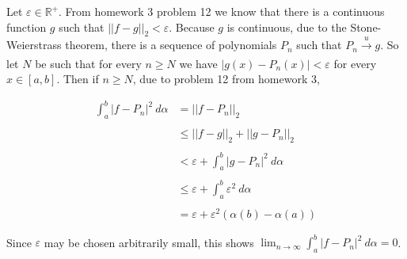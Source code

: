 \documentclass{article}
\begin{document}
  \vspace{1cm} 

  Let $\varepsilon\in\mathbb R^+$.  From homework 3 problem 12 we know that there is a continuous function $g$ such that $||f-g||_2 < \varepsilon$.  Because $g$ is continuous, due to the Stone-Weierstrass theorem, there is a sequence of polynomials $P_n$ such that $P_n\xrightarrow[]{u}g$.  So let $N$ be such that for every $n\ge N$ we have $|g(x)-P_n(x)|<\varepsilon$ for every $x\in [a,b]$.  Then if $n\ge N$, due to problem 12 from homework 3,

  \begin{align*}
    \int_a^b|f-P_n|^2 \ d\alpha &= ||f-P_n||_2 \\\\
    &\leq ||f-g||_2 + ||g-P_n||_2 \\\\
    &< \varepsilon + \int_a^b|g-P_n|^2 \ d\alpha \\\\
    & \leq \varepsilon + \int_a^b \varepsilon^2\ d\alpha \\\\
    &= \varepsilon + \varepsilon^2(\alpha(b)-\alpha(a))
  \end{align*}

  Since $\varepsilon$ may be chosen arbitrarily small, this shows $\lim_{n\to\infty}\int_a^b |f-P_n|^2 \ d\alpha = 0$.  


   \pagebreak
\end{document}
